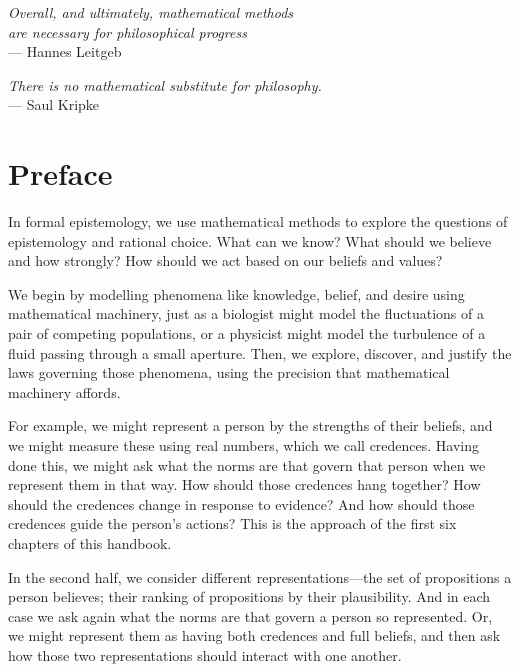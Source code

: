 

\begin{flushright}
    \textit{Overall, and ultimately, mathematical methods\\
    are necessary for philosophical progress\\}
    \smallskip
    {\small --- Hannes Leitgeb}

    \bigskip

    \textit{There is no mathematical substitute for philosophy.\\}
    \smallskip
    {\small --- Saul Kripke}
\end{flushright}

\bigskip

\begingroup
\let\clearpage\relax
\let\cleardoublepage\relax
\let\cleardoublepage\relax
\chapter*{Preface}

In formal epistemology, we use mathematical methods to explore the questions of epistemology and rational choice. What can we know? What should we believe and how strongly? How should we act based on our beliefs and values?

We begin by modelling phenomena like knowledge, belief, and desire using mathematical machinery, just as a biologist might model the fluctuations of a pair of competing populations, or a physicist might model the turbulence of a fluid passing through a small aperture. Then, we explore, discover, and justify the laws governing those phenomena, using the precision that mathematical machinery affords.

For example, we might represent a person by the strengths of their beliefs, and we might measure these using real numbers, which we call credences. Having done this, we might ask what the norms are that govern that person when we represent them in that way. How should those credences hang together? How should the credences change in response to evidence? And how should those credences guide the person’s actions? This is the approach of the first six chapters of this handbook.

In the second half, we consider different representations---the set of propositions a person believes; their ranking of propositions by their plausibility. And in each case we ask again what the norms are that govern a person so represented. Or, we might represent them as having both credences and full beliefs, and then ask how those two representations should interact with one another.


